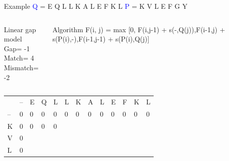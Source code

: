 \documentclass{bredelebeamer}
\begin{document}
 \begin{frame}{Example}
     \centering
 \textcolor{blue}{Q} = E Q L L K A L E F K L \quad \textcolor{blue}{P} = K V L E F G Y
\begin{columns}
\begin{block}{Linear gap model} \\
Gap= -1 \\
Match= 4 \\
Mismatch= -2
\end{block}
\begin{block}{Algorithm}
 F(i, j) =  max [0, F(i,j-1) + s(-,Q(j)),F(i-1,j) + s(P(i),-),F(i-1,j-1) + s(P(i),Q(j)]
\end{block}
\end{columns}
     
     \begin{table}[]
\centering
\begin{tabular}{*{13}{p{0.4cm}}}
                        & --                     & E                      & Q                      &\cellcolor[HTML]{FF0000} L                      & L                      & K                      & A                      & L                      & E                      & F                      & K                      & L                      \\ \cline{2-13} 
\multicolumn{1}{l|}{--} & \multicolumn{1}{l|}{0} & \multicolumn{1}{l|}{0} & \multicolumn{1}{l|}{0} & \multicolumn{1}{l|}{0} & \multicolumn{1}{l|}{0} & \multicolumn{1}{l|}{0} & \multicolumn{1}{l|}{0} & \multicolumn{1}{l|}{0} & \multicolumn{1}{l|}{0} & \multicolumn{1}{l|}{0} & \multicolumn{1}{l|}{0} & \multicolumn{1}{l|}{0} \\ \cline{2-13} 
\multicolumn{1}{l|}{\cellcolor[HTML]{FFFF00}K}  & \multicolumn{1}{l|}{0} & \multicolumn{1}{l|}{0}  & \multicolumn{1}{l|}{0}  & \multicolumn{1}{l|}{0}  & \multicolumn{1}{l|}{}  & \multicolumn{1}{l|}{}  & \multicolumn{1}{l|}{}  & \multicolumn{1}{l|}{}  & \multicolumn{1}{l|}{}  & \multicolumn{1}{l|}{}  & \multicolumn{1}{l|}{}  & \multicolumn{1}{l|}{}  \\ \cline{2-13} 
\multicolumn{1}{l|}{V}  & \multicolumn{1}{l|}{0} & \multicolumn{1}{l|}{}  & \multicolumn{1}{l|}{}  & \multicolumn{1}{l|}{}  & \multicolumn{1}{l|}{}  &    \multicolumn{1}{l|}{}  & \multicolumn{1}{l|}{}  & \multicolumn{1}{l|}{}  & \multicolumn{1}{l|}{}  & \multicolumn{1}{l|}{}  & \multicolumn{1}{l|}{}  & \multicolumn{1}{l|}{}  \\ \cline{2-13}  %
\multicolumn{1}{l|}{L}  & \multicolumn{1}{l|}{0} & \multicolumn{1}{l|}{}  & \multicolumn{1}{l|}{}  & \multicolumn{1}{l|}{}  & \multicolumn{1}{l|}{}  & \multicolumn{1}{l|}{}  & \multicolumn{1}{l|}{}  & \multicolumn{1}{l|}{}  & \multicolumn{1}{l|}{}  & \multicolumn{1}{l|}{}  & \multicolumn{1}{l|}{}  & \multicolumn{1}{l|}{}  \\ \cline{2-13} 

\end{tabular}
\end{table}
\end{frame}
\end{document}
